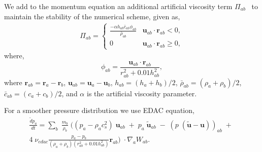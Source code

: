 \documentclass[preprint,12pt]{elsarticle}
\newcommand{\ten}[1]{\ensuremath{\mathbf{#1}}}
\begin{document}
We add to the momentum equation an additional artificial viscosity term
$\Pi_{ab}$~\cite{monaghan-review:2005} to maintain the stability of the
numerical scheme, given as,
\begin{align}
  \label{eq:mom-av}
  \Pi_{ab} =
  \begin{cases}
\frac{-\alpha h_{ab} \bar{c}_{ab} \phi_{ab}}{\bar{\rho}_{ab}}
  & \ten{u}_{ab}\cdot \ten{r}_{ab} < 0, \\
  0 & \ten{u}_{ab}\cdot \ten{r}_{ab} \ge 0,
\end{cases}
\end{align}
where,
%
\begin{equation}
  \label{eq:av-phiij}
  \phi_{ab} = \frac{\ten{u}_{ab} \cdot \ten{r}_{ab}}{r^2_{ab} + 0.01 h^2_{ab}},
\end{equation}
%
where $\ten{r}_{ab} = \ten{r}_a - \ten{r}_b$, $\ten{u}_{ab} = \ten{u}_a -
\ten{u}_b$, $h_{ab} = (h_a + h_b)/2$, $\bar{\rho}_{ab} = (\rho_a + \rho_b)/2$,
$\bar{c}_{ab} = (c_a + c_b) / 2$, and $\alpha$ is the artificial
viscosity parameter.

For a smoother pressure distribution we use EDAC equation,
\begin{multline}
  \label{eq:sph-discretization-edac}
  \frac{\tilde{d}p_a}{dt} = \sum_{b} \; \frac{m_b}{\rho_{b}} \; \bigg(
  (p_{a} - \rho_{a} c_{s}^2) \; \ten{u}_{ab} \; + \;
  p_{a} \; \tilde{\ten{u}}_{ab} \; - \;
  (p \; (\tilde{\ten{u}} - \ten{u}))_{ab} \; + \; \\
  4 \; \nu_{edac}
  \frac{p_a - p_b}{(\rho_a + \rho_b) (r^2_{ab} + 0.01 h_{ab}^{2})} \ten{r}_{ab}
  \bigg) \; \cdot \nabla_{a} W_{ab}.
\end{multline}
\end{document}
